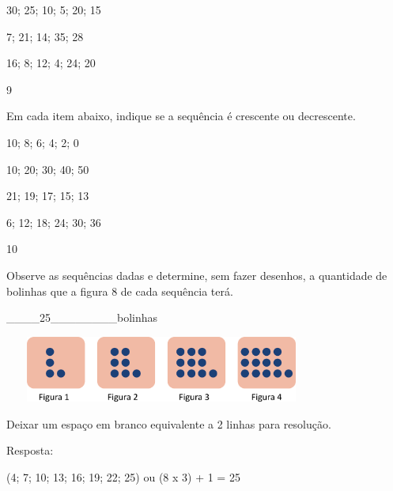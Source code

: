 \begin{escolha}
\begin{escolha}

\item
  30; 25; 10; 5; 20; 15

\item
  7; 21; 14; 35; 28

\item
  16; 8; 12; 4; 24; 20

\end{escolha}

\num{9}

Em cada item abaixo, indique se a sequência é crescente ou decrescente.

\begin{escolha}

\item
  10; 8; 6; 4; 2; 0

\item
  10; 20; 30; 40; 50

\item
  21; 19; 17; 15; 13

\item
  6; 12; 18; 24; 30; 36

\end{escolha}

\num{10}

Observe as sequências dadas e determine, sem fazer desenhos, a
quantidade de bolinhas que a figura 8 de cada sequência terá.

\begin{escolha}

\item
  \_\_\_\_25\_\_\_\_\_\_\_\_bolinhas
\end{escolha}

\includegraphics[width=4.09202in,height=0.85841in]{media/image32.png}

Deixar um espaço em branco equivalente a 2 linhas para resolução.

Resposta:

(4; 7; 10; 13; 16; 19; 22; 25) ou (8 x 3) + 1 = 25


\end{escolha}
